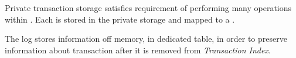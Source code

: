 Private transaction storage satisfies requirement of performing many operations within \transactionj. Each  is stored in the private storage and mapped to a \txItem.



    


The log stores information off memory, in dedicated table, in order to preserve information about transaction after it is removed from \emph{Transaction Index}.
